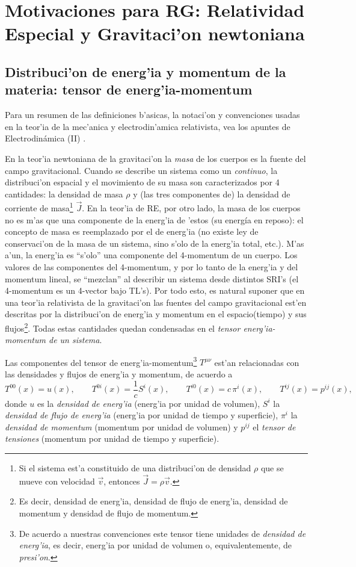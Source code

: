\chapter{Motivaciones para RG: Relatividad Especial y Gravitaci'on newtoniana}
\section{Distribuci'on de energ'ia y momentum de la materia: tensor de energ'ia-momentum}

Para un resumen de las definiciones b'asicas, la notaci'on y convenciones usadas en la teor'ia de la mec'anica y electrodin'amica relativista, vea los apuntes de Electrodin\'amica (II) \cite{7}.

En la teor'ia newtoniana de la gravitaci'on la \textit{masa} de los cuerpos es la fuente del campo gravitacional. Cuando se describe un sistema como un \textit{continuo}, la distribuci'on espacial y el movimiento de su masa son caracterizados por 4 cantidades: la densidad de masa $\rho$ y (las tres componentes de) la densidad de corriente de masa\footnote{Si el sistema est'a constituido de una distribuci'on de densidad $\rho$ que se mueve con velocidad $\vec{v}$, entonces $\vec{J}=\rho\vec{v}$.} $\vec{J}$. En la teor'ia de RE, por otro lado, la masa de los cuerpos no es m'as que una componente de la energ'ia de 'estos (su energía en reposo): el concepto de masa es reemplazado por el de energ'ia (no existe ley de conservaci'on de la masa de un sistema, sino s'olo de la energ'ia total, etc.). M'as a'un, la energ'ia es ``s'olo'' una componente del 4-momentum de un cuerpo. Los valores de las componentes del 4-momentum, y por lo tanto de la energ'ia y del momentum lineal, se ``mezclan'' al describir un sistema desde distintos SRI's (el 4-momentum es un 4-vector bajo TL's). Por todo esto, es natural suponer que en una teor'ia relativista de la gravitaci'on las fuentes del campo gravitacional est'en descritas por la distribuci'on de energ'ia y momentum en el espacio(tiempo) y sus flujos\footnote{Es decir, densidad de energ'ia, densidad de flujo de energ'ia, densidad de momentum y densidad de flujo de momentum.}. Todas estas cantidades quedan condensadas en el \textit{tensor energ'ia-momentum de un sistema}.

Las componentes del tensor de energ'ia-momentum\footnote{De acuerdo a nuestras convenciones este tensor tiene unidades de \textit{densidad de energ'ia}, es decir, energ'ia por unidad de volumen o, equivalentemente, de \textit{presi'on}.} $T^{\mu\nu}$ est'an relacionadas con las densidades y flujos de energ'ia y momentum, de acuerdo a
\begin{equation}
 T^{00}(x)=u(x), \qquad T^{0i}(x)=\frac{1}{c}S^i(x), \qquad T^{i0}(x)=c\,\pi^i(x), \qquad T^{ij}(x)=p^{ij}(x),
\end{equation}
donde $u$ es la \textit{densidad de energ'ia} (energ'ia por unidad de volumen), $S^i$ la \textit{densidad de flujo de energ'ia} (energ'ia por unidad de tiempo y superficie), $\pi^i$ la \textit{densidad de momentum} (momentum por unidad de volumen) y $p^{ij}$ el \textit{tensor de tensiones} (momentum por unidad de tiempo y superficie).


